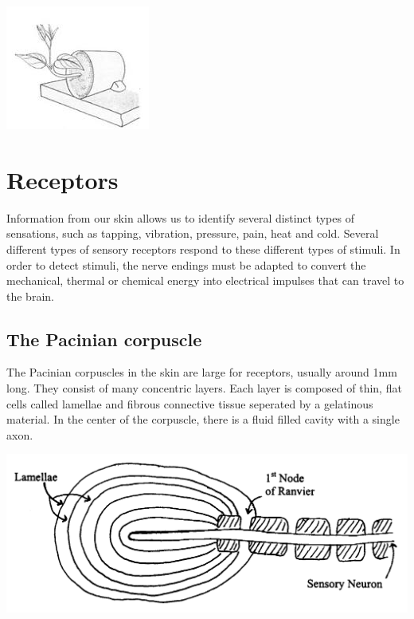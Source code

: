\documentclass{article}
\begin{document}
\begin{center}
	\includegraphics{geotropism}
\end{center}

\section*{Receptors}

Information from our skin allows us to identify several distinct types of
sensations, such as tapping, vibration, pressure, pain, heat and cold. Several
different types of sensory receptors respond to these different types of
stimuli.  In order to detect stimuli, the nerve endings must be adapted to
convert the mechanical, thermal or chemical energy into electrical impulses that
can travel to the brain.

\subsection*{The Pacinian corpuscle}

The Pacinian corpuscles in the skin are large for receptors, usually around 1mm
long. They consist of many concentric layers. Each layer is composed of thin,
flat cells called lamellae and fibrous connective tissue seperated by a
gelatinous material. In the center of the corpuscle, there is a fluid filled
cavity with a single axon.

\begin{center}
	\includegraphics[scale=0.2]{pacinian_corpuscle}
\end{center}
\end{document}
